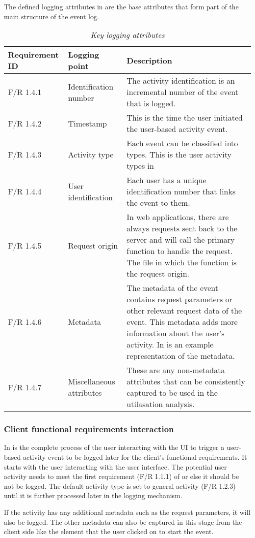 The defined logging attributes in  are the base attributes that form part of the main structure of the event log. 

\begin{table}[!htb]
	\centering
	\small
	\caption[Key logging attributes]
	{\textit{Key logging attributes}}
	\label{tbl:Ch2_KeyLogging_Attributes}
	\begin{tabularx}{\textwidth}{|l|l|X|}
		\hline \textbf{Requirement ID} & \textbf{Logging point} & \textbf{Description} \\
		\hline F/R 1.4.1 & Identification number & The activity identification is an incremental number of the event that is logged.\\
		\hline F/R 1.4.2 & Timestamp & This is the time the user initiated the user-based activity event.\\
		\hline F/R 1.4.3 & Activity type & Each event can be classified into types. This is the user activity types in \Cref{tbl:Ch2_User_ActivityTypes} \\
		\hline F/R 1.4.4 & User identification & Each user has a unique identification number that links the event to them. \\
		\hline F/R 1.4.5 & Request origin & In web applications, there are always requests sent back to the server and will call the primary function to handle the request. The file in which the function is the request origin. \\
		\hline F/R 1.4.6 & Metadata & The metadata of the event contains request parameters or other relevant request data of the event. This metadata adds more information about the user's activity. In \Cref{fig:Ch2_Metadata_Json_Example} is an example representation of the metadata. \\
		\hline F/R 1.4.7 & Miscellaneous attributes & These are any non-metadata attributes that can be consistently captured to be used in the utilasation analysis.\\ \hline
	\end{tabularx}
\end{table}

\clearpage

\subsubsection{Client functional requirements interaction}
\par In  is the complete process of the user interacting with the UI to trigger a user-based activity event to be logged later for the client's functional requirements. It starts with the user interacting with the user interface. The potential user activity needs to meet the first requirement (F/R 1.1.1) of  or else it should be not be logged. The default activity type is set to general activity (F/R 1.2.3) until it is further processed later in the logging mechanism.\par If the activity has any additional metadata such as the request parameters, it will also be logged. The other metadata can also be captured in this stage from the client side like the element that the user clicked on to start the event.

